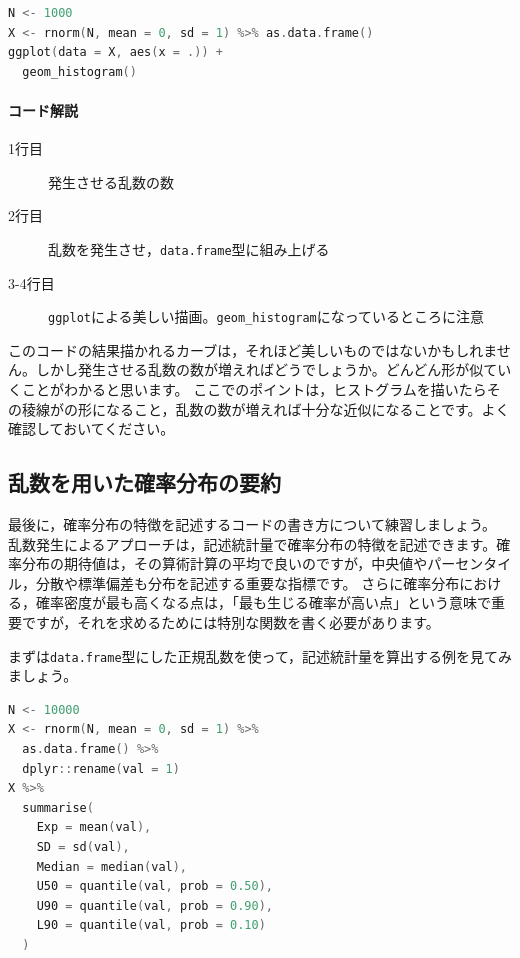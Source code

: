 \documentclass{ltjsbook}
\begin{document}
\begin{lstlisting}[language=c++,label={code:17_05},caption={確率分布の可視化2}]
N <- 1000
X <- rnorm(N, mean = 0, sd = 1) %>% as.data.frame()
ggplot(data = X, aes(x = .)) +
  geom_histogram()
\end{lstlisting}
\paragraph{コード解説}
\begin{description}
	\item[1行目] 発生させる乱数の数
	\item[2行目] 乱数を発生させ，\texttt{data.frame}型に組み上げる
	\item[3-4行目] \texttt{ggplot}による美しい描画。\verb|geom_histogram|になっているところに注意
\end{description}
このコードの結果描かれるカーブは，それほど美しいものではないかもしれません。しかし発生させる乱数の数が増えればどうでしょうか。どんどん形が似ていくことがわかると思います。
ここでのポイントは，ヒストグラムを描いたらその稜線がの形になること，乱数の数が増えれば十分な近似になることです。よく確認しておいてください。

\subsection{乱数を用いた確率分布の要約}
最後に，確率分布の特徴を記述するコードの書き方について練習しましょう。
乱数発生によるアプローチは，記述統計量で確率分布の特徴を記述できます。確率分布の期待値は，その算術計算の平均で良いのですが，中央値やパーセンタイル，分散や標準偏差も分布を記述する重要な指標です。
さらに確率分布における，確率密度が最も高くなる点は，「最も生じる確率が高い点」という意味で重要ですが，それを求めるためには特別な関数を書く必要があります。

まずは\texttt{data.frame}型にした正規乱数を使って，記述統計量を算出する例を見てみましょう。

\begin{lstlisting}[language=c++,label={code:17_06},caption={確率分布の要約}]
N <- 10000
X <- rnorm(N, mean = 0, sd = 1) %>%
  as.data.frame() %>%
  dplyr::rename(val = 1)
X %>%
  summarise(
    Exp = mean(val),
    SD = sd(val),
    Median = median(val),
    U50 = quantile(val, prob = 0.50),
    U90 = quantile(val, prob = 0.90),
    L90 = quantile(val, prob = 0.10)
  )
\end{lstlisting}
\end{document}
